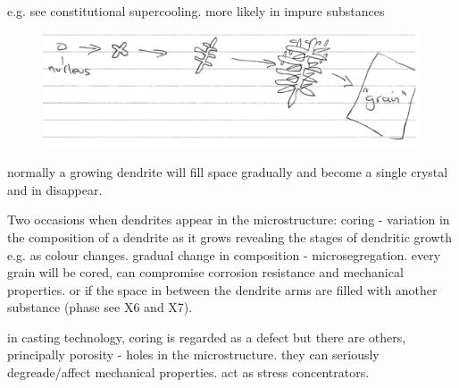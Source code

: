 \documentclass[class=report, crop=false, 12pt,a4paper]{standalone}
\begin{document}
e.g. see constitutional supercooling. more likely in impure substances
\begin{figure}[h!]
  \centering
  \includegraphics[width = \textwidth]{../img/dendriticgrowth}
\end{figure}
normally a growing dendrite will fill space gradually and become a single crystal and in disappear. 

Two occasions when dendrites appear in the microstructure: coring - variation in the composition of a dendrite as it grows revealing the stages of dendritic growth e.g. as colour changes. gradual change in composition - microsegregation. every grain will be cored, can compromise corrosion resistance and mechanical properties. or if the space in between the dendrite arms are filled with another substance (phase see X6 and X7). 

in casting technology, coring is regarded as a defect but there are others, principally porosity - holes in the microstructure. they can seriously degreade/affect mechanical properties. act as stress concentrators. 
\end{document}
